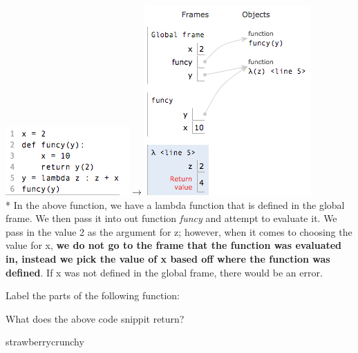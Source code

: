 \documentclass{article}
\begin{document}
\includegraphics[scale=.7]{../images/funcy1.png}{\Huge $\rightarrow$}\includegraphics[scale=.7]{../images/funcy2.png} \\* \bigskip
In the above function, we have a lambda function that is defined in the global frame. We then pass it into out function \emph{funcy} and attempt to evaluate it. We pass in the value 2 as the argument for z; however, when it comes to choosing the value for x, \textbf{we do not go to the frame that the function was evaluated in, instead we pick the value of x based off where the function was defined}. If x was not defined in the global frame, there would be an error. 
\newpage
{}
\begin{subq}
 \subqs Label the parts of the following function: 
 
  \bigskip
 
\begin{solution}


 \end{solution}
 \subqs What does the above code snippit return? 
 \begin{solution}
 strawberrycrunchy
 \end{solution}
\end{subq}
\newpage
\end{document}
